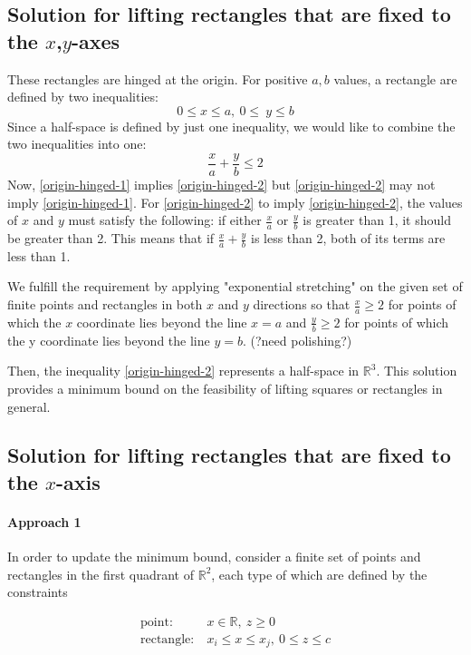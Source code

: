 \documentclass{NSF}
\begin{document}
\subsection{Solution for lifting rectangles that are fixed to the $x$,$y$-axes}
These rectangles are hinged at the origin. For positive $a,b$ values, a rectangle are defined by two inequalities: 
\begin{equation}\label{origin-hinged-1}
0 \leq x \leq a,\  0\leq \  y \leq b
\end{equation}
Since a half-space is defined by just one inequality, we would like to combine the two inequalities into one: 
\begin{equation}\label{origin-hinged-2}
\frac{x}{a} + \frac{y}{b} \leq 2
\end{equation}
Now, \eqref{origin-hinged-1} implies \eqref{origin-hinged-2} but \eqref{origin-hinged-2}  may not imply \eqref{origin-hinged-1}. For \eqref{origin-hinged-2} to imply \eqref{origin-hinged-2}, the values of $x$ and $y$ must satisfy the following: if either $\frac{x}{a}$ or $\frac{y}{b}$ is greater than 1, it should be greater than 2. This means that if $\frac{x}{a}+\frac{y}{b}$  is less than 2, both of its terms are less than 1.

We fulfill the requirement by applying "exponential stretching" on the given set of finite points and rectangles in both $x$ and $y$ directions so that $\frac{x}{a} \geq 2$  for points of which the $x$ coordinate lies beyond the line $x=a$ and $\frac{y}{b} \geq 2$ for points of which the y coordinate lies beyond the line $y=b$.  (?need polishing?)

Then, the inequality \eqref{origin-hinged-2} represents a half-space in $\mathbb{R}^3$. This solution provides a minimum bound on the feasibility of lifting squares or rectangles in general.



\subsection{Solution for lifting rectangles that are fixed to the $x$-axis}
\paragraph{Approach 1}
In order to update the minimum bound, consider a finite set of points and rectangles in the first quadrant of $\mathbb{R}^2$, each type of which are defined by the constraints

\begin{align*}
    \text{point:}& \ x \in \mathbb{R},\  z \geq 0 \\
    \text{rectangle:}& \ x_i \leq x \leq x_j,\ 0 \leq z \leq c
\end{align*}
\end{document}
